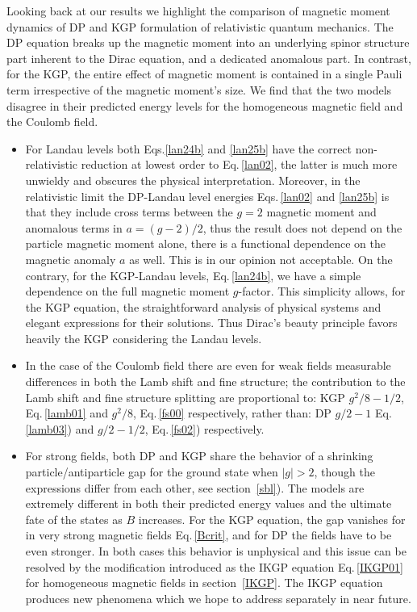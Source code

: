 \documentclass[epj]{svjour}
\begin{document}
Looking back at our results we highlight the comparison of magnetic moment dynamics of DP and KGP formulation of relativistic quantum mechanics. The DP equation breaks up the magnetic moment into an underlying spinor structure part inherent to the Dirac equation, and a dedicated anomalous part. In contrast, for the KGP, the entire effect of magnetic moment is contained in a single Pauli term irrespective of the magnetic moment\rq s size. We find that the two models disagree in their predicted energy levels for the homogeneous magnetic field and the Coulomb field.
\begin{itemize}
\item
For Landau levels both Eqs.\;\eqref{lan24b} and \eqref{lan25b} have the correct non-relativistic reduction at lowest order to Eq.\,\eqref{lan02}, the latter is much more unwieldy and obscures the physical interpretation. Moreover, in the relativistic limit the DP-Landau level energies Eqs.\,\eqref{lan02} and \eqref{lan25b} is that they include cross terms between the $g=2$ magnetic moment and anomalous terms in $a=(g-2)/2$, thus the result does not depend on the particle magnetic moment alone, there is a functional dependence on the magnetic anomaly $a$ as well. This is in our opinion not acceptable. On the contrary, for the KGP-Landau levels, Eq.\,\eqref{lan24b}, we have a simple dependence on the full magnetic moment $g$-factor. This simplicity allows, for the KGP equation, the straightforward analysis of physical systems and elegant expressions for their solutions. Thus Dirac\rq s beauty principle favors heavily the KGP considering the Landau levels.
\item
In the case of the Coulomb field there are even for weak fields measurable differences in both the Lamb shift and fine structure; the contribution to the Lamb shift and fine structure splitting are proportional to: KGP $g^{2}/8-1/2$, Eq.\,\eqref{lamb01} and $g^{2}/8$, Eq.\,\eqref{fs00} respectively, rather than: DP $g/2-1$ Eq.\,\eqref{lamb03}) and $g/2-1/2$, Eq.\,\eqref{fs02}) respectively.
\item For strong fields, both DP and KGP share the behavior of a shrinking particle/antiparticle gap for the ground state when $|g|>2$, though the expressions differ from each other, see section~\ref{sbl}). The models are extremely different in both their predicted energy values and the ultimate fate of the states as $B$ increases. For the KGP equation, the gap vanishes for in very strong magnetic fields Eq.\,\eqref{Bcrit}, and for DP the fields have to be even stronger. In both cases this behavior is unphysical and this issue can be resolved by the modification introduced as the IKGP equation Eq.\,\eqref{IKGP01} for homogeneous magnetic fields in section~\ref{IKGP}. The IKGP equation produces new phenomena which we hope to address separately in near future.

\end{itemize}
\end{document}
